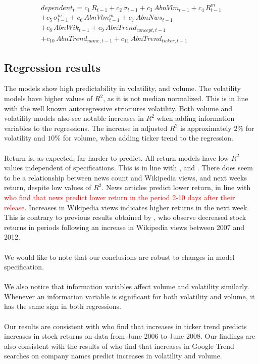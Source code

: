 \begin{equation}
\begin{split}
    dependent_t = c_1\,R_{t-1}+c_2\,\sigma_{t-1}+c_3\,AbnVlm_{t-1}+c_4\,R_{t-1}^m\\
    +c_5\,\sigma_{t-1}^m+c_6\,AbnVlm_{t-1}^m+c_7\,AbnNws_{t-1}\\
    +c_8\,AbnWik_{t-1}+c_9\,AbnTrend_{concept, t-1}\\
    +c_{10}\,AbnTrend_{name, t-1}+c_{11}\,AbnTrend_{ticker, t-1}
\end{split}
\end{equation}

\subsection{Regression results}
The models show high predictability in volatility, and volume. The volatility models have higher values of $R^2$, as it is not median normalized. This is in line with the well known autoregressive structures volatility. Both volume and volatility models also see notable increases in $R^2$ when adding information variables to the regressions. The increase in adjusted $R^2$ is approximately $2\%$ for volatility and $10\%$ for volume, when adding ticker trend to the regression. 
\\\\
Return is, as expected, far harder to predict. All return models have low $R^2$ values independent of specifications. This is in line with \cite{engelberg}, \cite{neri} and \cite{bijl}. There does seem to be a relationship between news count and Wikipedia views, and next weeks return, despite low values of $R^2$. News articles predict lower return, in line with \textcolor{red}{\cite{aquadi} who find that news predict lower return in the period 2-10 days after their release}. Increases in Wikipedia views indicates higher returns in the next week. This is contrary to previous results obtained by \cite{moat}, who observe decreased stock returns in periods following an increase in Wikipedia views between 2007 and 2012.
\\\\
We would like to note that our conclusions are robust to changes in model specification.
\\\\
We also notice that information variables affect volume and volatility similarly.  Whenever an information variable is significant for both volatility and volume, it has the same sign in both regressions.
\\\\
Our results are consistent with \cite{engelberg} who find that increases in ticker trend predicts increases in stock returns on data from June 2006 to June 2008. Our findings are also consistent with the results of \cite{vlastakis} who find that increases in Google Trend searches on company names predict increases in volatility and volume. 

